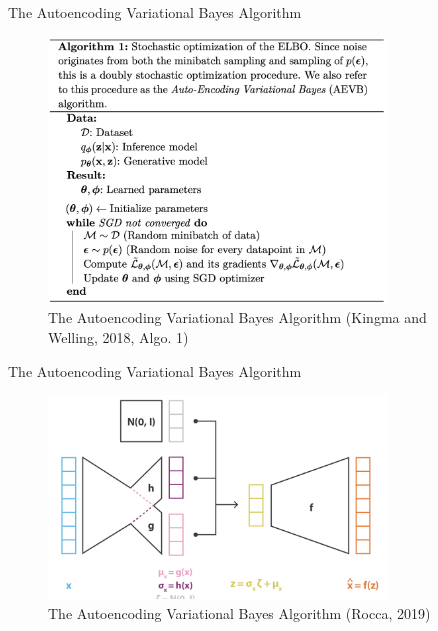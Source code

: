 \documentclass[10pt]{beamer}
\begin{document}
\begin{frame}{The Autoencoding Variational Bayes Algorithm}

\begin{figure}[h]
\centering
\includegraphics[width=0.8\textwidth]{fig/Kingma_Welling_2018_Algo_1.png}
\caption{The Autoencoding Variational Bayes Algorithm (Kingma and Welling, 2018, Algo. 1)}
\end{figure}

\end{frame}


\begin{frame}{The Autoencoding Variational Bayes Algorithm}

\begin{figure}[h]
\centering
\includegraphics[width=0.8\textwidth]{fig/Rocca_VAE_full_reparmetr.png}
\caption{The Autoencoding Variational Bayes Algorithm (Rocca, 2019)}
\end{figure}

\end{frame}
\end{document}
